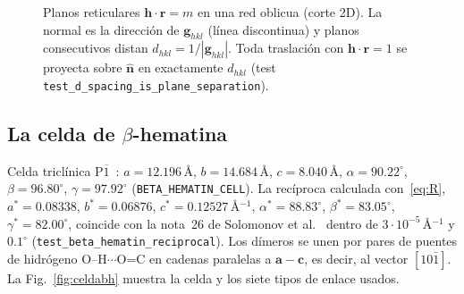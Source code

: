 \documentclass[11pt,a4paper]{article}
\newcommand{\code}[1]{\texttt{#1}}
\newcommand{\vect}[1]{\mathbf{#1}}
\begin{document}
\begin{figure}[t]
\centering
{}
\caption{Planos reticulares $\vect h\cdot\vect r=m$ en una red oblicua (corte 2D). La normal es la
dirección de $\vect g_{hkl}$ (línea discontinua) y planos consecutivos distan $d_{hkl}=1/|\vect
g_{hkl}|$. Toda traslación con $\vect h\cdot\vect r=1$ se proyecta sobre $\hat{\vect n}$ en
exactamente $d_{hkl}$ (test \code{test\_d\_spacing\_is\_plane\_separation}).}
\label{fig:planos}
\end{figure}

\subsection{La celda de \texorpdfstring{$\beta$}{beta}-hematina}

Celda triclínica P$\overline1$~\cite{pagola2000}: $a=12.196$\,Å, $b=14.684$\,Å, $c=8.040$\,Å,
$\alpha=90.22^\circ$, $\beta=96.80^\circ$, $\gamma=97.92^\circ$ (\code{BETA\_HEMATIN\_CELL}). La
recíproca calculada con~\eqref{eq:R}, $a^*=0.08338$, $b^*=0.06876$, $c^*=0.12527$\,Å$^{-1}$,
$\alpha^*=88.83^\circ$, $\beta^*=83.05^\circ$, $\gamma^*=82.00^\circ$, coincide con la nota~26 de
Solomonov et al.~\cite{solomonov2007} dentro de $3\cdot10^{-5}$\,Å$^{-1}$ y $0.1^\circ$
(\code{test\_beta\_hematin\_reciprocal}). Los dímeros se unen por pares de puentes de hidrógeno
O--H$\cdots$O=C en cadenas paralelas a $\vect a-\vect c$, es decir, al vector $[10\bar1]$. La
Fig.~\ref{fig:celdabh} muestra la celda y los siete tipos de enlace usados.
\end{document}
